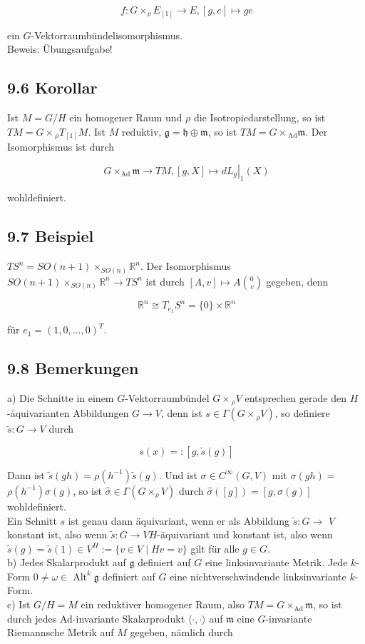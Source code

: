 \documentclass[10pt, letterpaper]{article}
\begin{document}
$$
f: G \times_{\rho} E_{[1]} \rightarrow E,[g, e] \mapsto g e
$$

ein $G$-Vektorraumbündelisomorphismus.\\
Beweis: Übungsaufgabe!

\subsection*{9.6 Korollar}
Ist $M=G / H$ ein homogener Raum und $\rho$ die Isotropiedarstellung, so ist $T M=G \times{ }_{\rho} T_{[1]} M$. Ist $M$ reduktiv, $\mathfrak{g}=\mathfrak{h} \oplus \mathfrak{m}$, so ist $T M=G \times{ }_{\mathrm{Ad}} \mathfrak{m}$. Der Isomorphismus ist durch

$$
G \times_{\mathrm{Ad}} \mathfrak{m} \rightarrow T M,\left.[g, X] \mapsto d L_{g}\right|_{1}(X)
$$

wohldefiniert.

\subsection*{9.7 Beispiel}
$T S^{n}=S O(n+1) \times_{S O(n)} \mathbb{R}^{n}$. Der Isomorphismus $S O(n+1) \times_{S O(n)} \mathbb{R}^{n} \rightarrow T S^{n}$ ist durch $[A, v] \mapsto A\binom{0}{v}$ gegeben, denn

$$
\mathbb{R}^{n} \cong T_{e_{1}} S^{n}=\{0\} \times \mathbb{R}^{n}
$$

für $e_{1}=(1,0, \ldots, 0)^{T}$.

\subsection*{9.8 Bemerkungen}
a) Die Schnitte in einem $G$-Vektorraumbündel $G \times{ }_{\rho} V$ entsprechen gerade den $H$-äquivarianten Abbildungen $G \rightarrow V$, denn ist $s \in \Gamma\left(G \times{ }_{\rho} V\right)$, so definiere $\tilde{s}: G \rightarrow V$ durch

$$
s(x)=:[g, \tilde{s}(g)]
$$

Dann ist $\tilde{s}(g h)=\rho\left(h^{-1}\right) \tilde{s}(g)$. Und ist $\sigma \in C^{\infty}(G, V)$ mit $\sigma(g h)=$ $\rho\left(h^{-1}\right) \sigma(g)$, so ist $\hat{\sigma} \in \Gamma\left(G \times_{\rho} V\right)$ durch $\hat{\sigma}([g])=[g, \sigma(g)]$ wohldefiniert.\\
Ein Schnitt $s$ ist genau dann äquivariant, wenn er als Abbildung $\tilde{s}: G \rightarrow$ $V$ konstant ist, also wenn $\tilde{s}: G \rightarrow V H$-äquivariant und konstant ist, also wenn $\tilde{s}(g)=\tilde{s}(1) \in V^{H}:=\{v \in V \mid H v=v\}$ gilt für alle $g \in G$.\\
b) Jedes Skalarprodukt auf $\mathfrak{g}$ definiert auf $G$ eine linksinvariante Metrik. Jede $k$-Form $0 \neq \omega \in \operatorname{Alt}^{k} \mathfrak{g}$ definiert auf $G$ eine nichtverschwindende linksinvariante $k$-Form.\\
c) Ist $G / H=M$ ein reduktiver homogener Raum, also $T M=G \times_{\mathrm{Ad}} \mathfrak{m}$, so ist durch jedes Ad-invariante Skalarprodukt $\langle\cdot, \cdot\rangle$ auf $\mathfrak{m}$ eine $G$-invariante Riemannsche Metrik auf $M$ gegeben, nämlich durch
\end{document}
